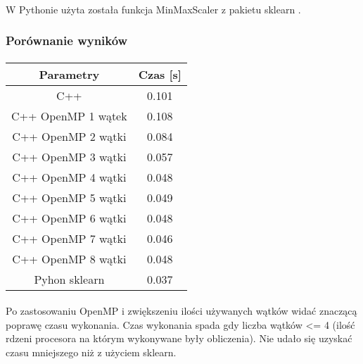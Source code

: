 \documentclass[a4paper,11pt]{article}
\begin{document}
\paragraph{}W Pythonie użyta została funkcja MinMaxScaler z pakietu sklearn .
\subsubsection{Porównanie wyników} 
\paragraph{}
\begin{tabular}{|c|c|}
\hline Parametry&Czas [s] \\ 
\hline C++ & 0.101 \\
\hline C++ OpenMP 1 wątek& 0.108 \\
\hline C++ OpenMP 2 wątki& 0.084 \\
\hline C++ OpenMP 3 wątki& 0.057 \\
\hline C++ OpenMP 4 wątki& 0.048 \\
\hline C++ OpenMP 5 wątki& 0.049 \\
\hline C++ OpenMP 6 wątki& 0.048 \\
\hline C++ OpenMP 7 wątki& 0.046 \\
\hline C++ OpenMP 8 wątki& 0.048 \\
\hline
\hline Pyhon sklearn& 0.037 \\
\hline
\end{tabular}
\paragraph{}
Po zastosowaniu OpenMP i zwiększeniu ilości używanych wątków widać znaczącą poprawę czasu wykonania. Czas wykonania spada gdy liczba wątków <= 4 (ilość rdzeni procesora na którym wykonywane były obliczenia). Nie udało się uzyskać czasu mniejszego niż z użyciem sklearn.\\
\end{document}
